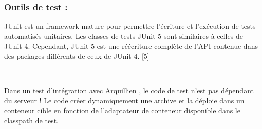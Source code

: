 \documentclass{article}
\begin{document}
{\subsubsection{Outils de test : }
\begin{minipage}{0.15\textwidth}
	\begin{minipage}{\linewidth}
	\end{minipage}
\end{minipage}
\hfill
\begin{minipage}{0.75\textwidth}
\vspace{0.5cm}
JUnit est un framework mature pour permettre l'écriture et l'exécution de tests automatisés unitaires. Les classes de tests JUnit 5 sont similaires à celles de JUnit 4. Cependant, JUnit 5 est une réécriture complète de l'API contenue dans des packages différents de ceux de JUnit 4. [5]\\
\end{minipage}\\
\vspace{0.7}
\begin{minipage}{0.2\textwidth}
	\begin{minipage}{\linewidth}
	\end{minipage}
\end{minipage}
\hfill
\begin{minipage}{0.75\textwidth}
\vspace{0.7cm}
	Dans un test d’intégration avec Arquillien , le code de test n’est pas dépendant du serveur ! Le code créer dynamiquement une archive et la déploie dans un conteneur cible en fonction de l’adaptateur de conteneur disponible dans le classpath de test.
\\
\end{minipage}\\

}
\end{document}
